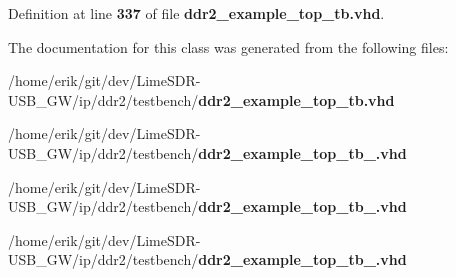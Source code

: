 Definition at line {\bf 337} of file {\bf ddr2\+\_\+example\+\_\+top\+\_\+tb.\+vhd}.



The documentation for this class was generated from the following files\+:\begin{DoxyCompactItemize}
\item 
/home/erik/git/dev/\+Lime\+S\+D\+R-\/\+U\+S\+B\+\_\+\+G\+W/ip/ddr2/testbench/{\bf ddr2\+\_\+example\+\_\+top\+\_\+tb.\+vhd}\item 
/home/erik/git/dev/\+Lime\+S\+D\+R-\/\+U\+S\+B\+\_\+\+G\+W/ip/ddr2/testbench/{\bf ddr2\+\_\+example\+\_\+top\+\_\+tb\+\_.\+vhd}\item 
/home/erik/git/dev/\+Lime\+S\+D\+R-\/\+U\+S\+B\+\_\+\+G\+W/ip/ddr2/testbench/{\bf ddr2\+\_\+example\+\_\+top\+\_\+tb\+\_.\+vhd}\item 
/home/erik/git/dev/\+Lime\+S\+D\+R-\/\+U\+S\+B\+\_\+\+G\+W/ip/ddr2/testbench/{\bf ddr2\+\_\+example\+\_\+top\+\_\+tb\+\_.\+vhd}\end{DoxyCompactItemize}
